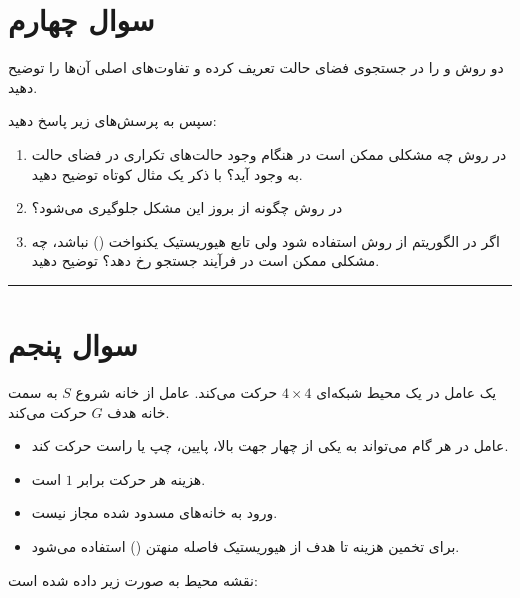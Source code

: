 \documentclass[a4paper,10pt]{article}
\begin{document}
\section{\textcolor{AccentGold}{سوال چهارم}}

دو روش  و  را در جستجوی فضای حالت تعریف کرده و تفاوت‌های اصلی آن‌ها را توضیح دهید.

سپس به پرسش‌های زیر پاسخ دهید:

\begin{enumerate}
	
	\item
	در روش  چه مشکلی ممکن است در هنگام وجود حالت‌های تکراری در فضای حالت به وجود آید؟ با ذکر یک مثال کوتاه توضیح دهید.
	
	\item
	در روش  چگونه از بروز این مشکل جلوگیری می‌شود؟
	
	\item
	اگر در الگوریتم  از روش  استفاده شود ولی تابع هیوریستیک یکنواخت () نباشد، چه مشکلی ممکن است در فرآیند جستجو رخ دهد؟ توضیح دهید.
	
\end{enumerate}


\bigskip
\textcolor{AccentCyan}{\rule{\linewidth}{0.4pt}}

\section{\textcolor{AccentGold}{سوال پنجم}}

یک عامل در یک محیط شبکه‌ای $4\times4$ حرکت می‌کند. عامل از خانه شروع $S$ به سمت خانه هدف $G$ حرکت می‌کند.

\begin{itemize}
	\item عامل در هر گام می‌تواند به یکی از چهار جهت بالا، پایین، چپ یا راست حرکت کند.
	\item هزینه هر حرکت برابر $1$ است.
	\item ورود به خانه‌های مسدود شده مجاز نیست.
	\item برای تخمین هزینه تا هدف از هیوریستیک فاصله منهتن () استفاده می‌شود.
\end{itemize}

نقشه محیط به صورت زیر داده شده است:
\end{document}
